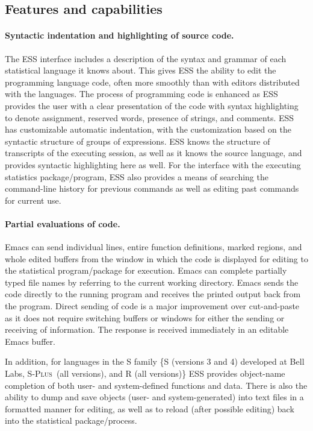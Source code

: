 \documentclass{article}
\newcommand*{\Splus}{\textsc{S-Plus}}
\begin{document}
\subsection{Features and capabilities}
\label{sec:ESS:features}

\paragraph{Syntactic indentation and highlighting of source code.}
The ESS interface includes a description of the syntax and grammar of
each statistical language it knows about.  This gives ESS the ability
to edit the programming language code, often more smoothly than with
editors distributed with the languages.  The process of programming
code is enhanced as ESS provides the user with a clear presentation of
the code with syntax highlighting to denote assignment, reserved
words, presence of strings, and comments.  ESS has customizable
automatic indentation, with the customization based on the syntactic
structure of groups of expressions.  ESS knows the structure of
transcripts of the executing session, as well as it knows the source
language, and provides syntactic highlighting here as well.  For the
interface with the executing statistics package/program, ESS also
provides a means of searching the command-line history for previous
commands as well as editing past commands for current use.

\paragraph{Partial evaluations of code.}
Emacs can send individual lines, entire function definitions, marked
regions, and whole edited buffers from the window in which the code is
displayed for editing to the statistical program/package for
execution.  Emacs can complete partially typed file names by referring
to the current working directory.  Emacs sends the code directly to
the running program and receives the printed output back from the
program.  Direct sending of code is a major improvement over
cut-and-paste as it does not require switching buffers or windows for
either the sending or receiving of information.  The response is
received immediately in an editable Emacs buffer.

In addition, for languages in the S family \{S (versions 3 and 4)
developed at Bell Labs, \Splus\ (all versions), and R (all versions)\}
ESS provides object-name completion of both user- and system-defined
functions and data.  There is also the ability to dump and save
objects (user- and system-generated) into text files in a formatted
manner for editing, as well as to reload (after possible editing) back
into the statistical package/process.
\end{document}
